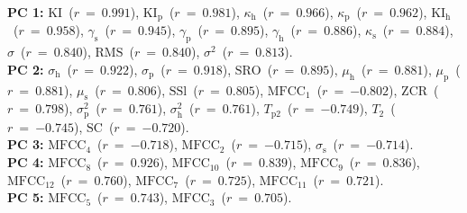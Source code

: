 {\bf{PC 1:}} $\mathrm{KI}$~($r~=~{0.991}$), $\mathrm{KI_{p}}$~($r~=~{0.981}$), $\kappa_{\mathrm{h}}$~($r~=~{0.966}$), $\kappa_{\mathrm{p}}$~($r~=~{0.962}$), $\mathrm{KI_{h}}$~($r~=~{0.958}$), $\gamma_{\mathrm{s}}$~($r~=~{0.945}$), $\gamma_{\mathrm{p}}$~($r~=~{0.895}$), $\gamma_{\mathrm{h}}$~($r~=~{0.886}$), $\kappa_{\mathrm{s}}$~($r~=~{0.884}$), $\sigma$~($r~=~{0.840}$), $\mathrm{RMS}$~($r~=~{0.840}$), $\sigma^{2}$~($r~=~{0.813}$).\vspace{0.5em}\\
{\bf{PC 2:}} $\sigma_{\mathrm{h}}$~($r~=~{ 0.922}$), $\sigma_{\mathrm{p}}$~($r~=~{ 0.918}$), $\mathrm{SRO}$~($r~=~{ 0.895}$), $\mu_{\mathrm{h}}$~($r~=~{ 0.881}$), $\mu_{\mathrm{p}}$~($r~=~{ 0.881}$), $\mu_{\mathrm{s}}$~($r~=~{ 0.806}$), $\mathrm{SSl}$~($r~=~{ 0.805}$), $\mathrm{MFCC}_{1}$~($r~=~{-0.802}$), $\mathrm{ZCR}$~($r~=~{ 0.798}$), $\sigma_{\mathrm{p}}^{2}$~($r~=~{ 0.761}$), $\sigma_{\mathrm{h}}^{2}$~($r~=~{ 0.761}$), $T_{\mathrm{p}2}$~($r~=~{-0.749}$), $T_{2}$~($r~=~{-0.745}$), $\mathrm{SC}$~($r~=~{-0.720}$).\vspace{0.5em}\\
{\bf{PC 3:}} $\mathrm{MFCC}_{4}$~($r~=~{-0.718}$), $\mathrm{MFCC}_{2}$~($r~=~{-0.715}$), $\sigma_{\mathrm{s}}$~($r~=~{-0.714}$).\vspace{0.5em}\\
{\bf{PC 4:}} $\mathrm{MFCC}_{8}$~($r~=~{0.926}$), $\mathrm{MFCC}_{10}$~($r~=~{0.839}$), $\mathrm{MFCC}_{9}$~($r~=~{0.836}$), $\mathrm{MFCC}_{12}$~($r~=~{0.760}$), $\mathrm{MFCC}_{7}$~($r~=~{0.725}$), $\mathrm{MFCC}_{11}$~($r~=~{0.721}$).\vspace{0.5em}\\
{\bf{PC 5:}} $\mathrm{MFCC}_{5}$~($r~=~{0.743}$), $\mathrm{MFCC}_{3}$~($r~=~{0.705}$).
